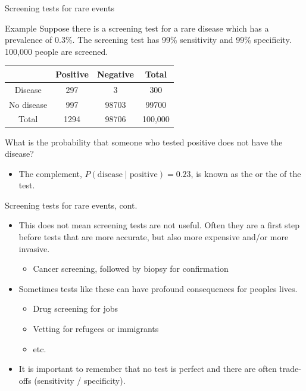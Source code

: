 \documentclass[xcolor=table, aspectratio=169, bigger, handout]{beamer}
\begin{document}
\begin{frame}{Screening tests for rare events}
\begin{exampleblock}{Example}
Suppose there is a screening test for a rare disease which has a prevalence of 0.3\%. The screening test has 99\% sensitivity and 99\% specificity. 100,000 people are screened.\\
\smallskip
{\centering \renewcommand{\arraystretch}{1}
\begin{tabular}{c | c  c | c}
 & Positive & Negative & Total \\
\hline
Disease & 297 & 3 & 300\\
No disease & 997 & 98703 & 99700\\
\hline
Total & 1294 & 98706 & 100,000 
\end{tabular}\par
\renewcommand{\arraystretch}{1.5}
}
\smallskip
What is the probability that someone who tested positive does not have the disease?\\ \smallskip \pause
{}
\begin{itemize}
\pause\item The complement, $P(\text{disease} \mid  \text{positive}) = 0.23$, is known as the  or the  of the test.
\end{itemize}

\end{exampleblock}
\end{frame}

\begin{frame}{Screening tests for rare events, cont.}
\begin{block}{}
\begin{itemize}
\item This does not mean screening tests are not useful. Often they are a first step before tests that are more accurate, but also more expensive and/or more invasive.
\begin{itemize}
\item Cancer screening, followed by biopsy for confirmation
\end{itemize}

\pause
\item Sometimes tests like these can have profound consequences for peoples lives.
\begin{itemize}
\item Drug screening for jobs
\item Vetting for refugees or immigrants 
\item etc.
\end{itemize}

\pause
\item It is important to remember that no test is perfect and there are often trade-offs (sensitivity / specificity).
\end{itemize}
\end{block}
\end{frame}
\end{document}
